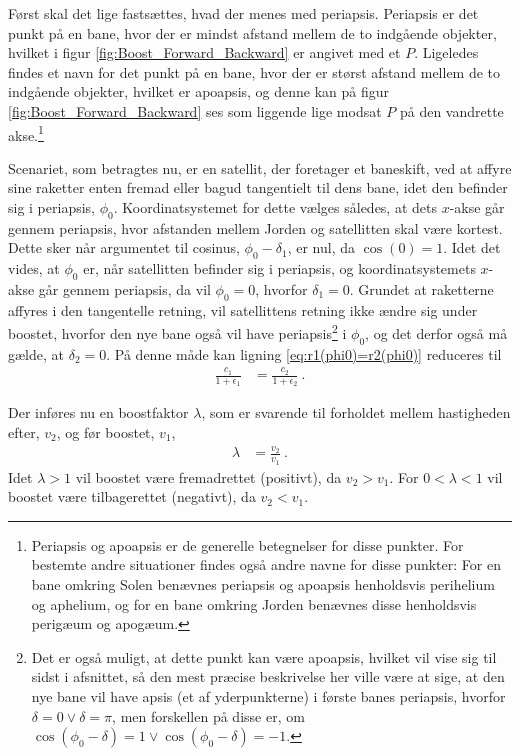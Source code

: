 Først skal det lige fastsættes, hvad der menes med periapsis. Periapsis er det punkt på en bane, hvor der er mindst afstand mellem de to indgående objekter, hvilket i figur \ref{fig:Boost_Forward_Backward} er angivet med et $P$. Ligeledes findes et navn for det punkt på en bane, hvor der er størst afstand mellem de to indgående objekter, hvilket er apoapsis, og denne kan på figur \ref{fig:Boost_Forward_Backward} ses som liggende lige modsat $P$ på den vandrette akse.\footnote{Periapsis og apoapsis er de generelle betegnelser for disse punkter. For bestemte andre situationer findes også andre navne for disse punkter: For en bane omkring Solen benævnes periapsis og apoapsis henholdsvis perihelium og aphelium, og for en bane omkring Jorden benævnes disse henholdsvis perigæum og apogæum.}

\noindent
Scenariet, som betragtes nu, er en satellit, der foretager et baneskift, ved at affyre sine raketter enten fremad eller bagud tangentielt til dens bane, idet den befinder sig i periapsis, $\phi_0$. Koordinatsystemet for dette vælges således, at dets $x$-akse går gennem periapsis, hvor afstanden mellem Jorden og satellitten skal være kortest. Dette sker når argumentet til cosinus, $\phi_0-\delta_1$, er nul, da $\cos(0)=1$. Idet det vides, at $\phi_0$ er, når satellitten befinder sig i periapsis, og koordinatsystemets $x$-akse går gennem periapsis, da vil $\phi_0 = 0$, hvorfor $\delta_1 = 0$. Grundet at raketterne affyres i den tangentelle retning, vil satellittens retning ikke ændre sig under boostet, hvorfor den nye bane også vil have periapsis\footnote{Det er også muligt, at dette punkt kan være apoapsis, hvilket vil vise sig til sidst i afsnittet, så den mest præcise beskrivelse her ville være at sige, at den nye bane vil have apsis (et af yderpunkterne) i første banes periapsis, hvorfor $\delta = 0 \vee \delta = \pi$, men forskellen på disse er, om $\cos(\phi_0-\delta) = 1 \vee \cos(\phi_0-\delta) = -1$.} i $\phi_0$, og det derfor også må gælde, at $\delta_2 = 0$. På denne måde kan ligning \eqref{eq:r1(phi0)=r2(phi0)} reduceres til
\begin{align} \label{eq:Reduceret_r1(phi0)=r2(phi0)}
	\frac{c_1}{1+\epsilon_1} &= \frac{c_2}{1+\epsilon_2} \: .
\end{align}

\noindent
Der inføres nu en boostfaktor $\lambda$, som er svarende til forholdet mellem hastigheden efter, $v_2$, og før boostet, $v_1$,
\begin{align} \label{eq:Baneskift_boostfaktor}
	\lambda &= \frac{v_2}{v_1} \: .
\end{align}
Idet $\lambda > 1$ vil boostet være fremadrettet (positivt), da $v_2 > v_1$. For $0 < \lambda < 1$ vil boostet være tilbagerettet (negativt), da $v_2 < v_1$.

